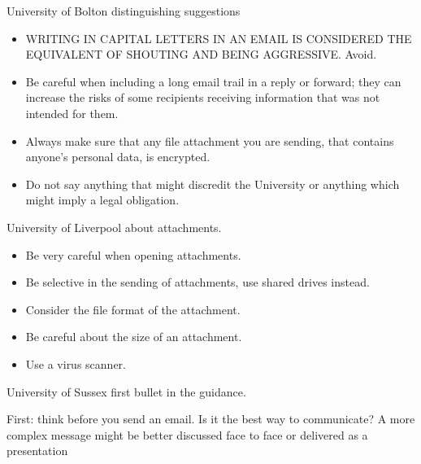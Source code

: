 \documentclass{beamer}
\begin{document}
\begin{frame}{University of Bolton distinguishing suggestions}
  \begin{itemize}
    \item WRITING IN CAPITAL LETTERS IN AN EMAIL IS CONSIDERED THE EQUIVALENT OF
          SHOUTING AND BEING AGGRESSIVE. Avoid.
    \item Be careful when including a long email trail in a reply or forward; they can increase the risks of some
          recipients receiving information that was not intended for them.
    \item Always make sure that any file attachment you are sending, that contains anyone's personal data, is
          encrypted.
    \item Do not say anything that might discredit the University or anything which might imply a legal
          obligation.
  \end{itemize}
\end{frame}

\begin{frame}{University of Liverpool \cite{Liverpool} about attachments.}
  \begin{itemize}
    \item Be very careful when opening attachments.
    \item Be selective in the sending of attachments, use shared drives instead.
    \item Consider the file format of the attachment.
    \item Be careful about the size of an attachment.
    \item Use a virus scanner.
  \end{itemize}
\end{frame}

\begin{frame}{University of Sussex \cite{Sussex} first bullet in the guidance.}
  \begin{displayquote}
    First: think before you send an email. Is it the best way to communicate? A more complex
    message might be better discussed face to face or delivered as a presentation
  \end{displayquote}
\end{frame}
\end{document}
